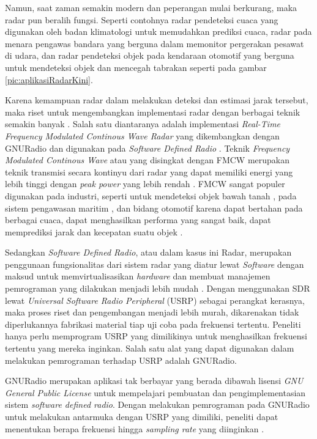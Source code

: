 Namun, saat zaman semakin modern dan peperangan mulai berkurang, maka radar pun beralih fungsi. Seperti contohnya radar pendeteksi cuaca yang digunakan oleh badan klimatologi untuk memudahkan prediksi cuaca, radar pada menara pengawas bandara yang berguna dalam memonitor pergerakan pesawat di udara, dan radar pendeteksi objek pada kendaraan otomotif yang berguna untuk mendeteksi objek dan mencegah tabrakan seperti pada gambar \ref{pic:aplikasiRadarKini}.

Karena kemampuan radar dalam melakukan deteksi dan estimasi jarak tersebut, maka riset untuk mengembangkan implementasi radar dengan berbagai teknik semakin banyak \cite{Jia2020,Xia2021,MoraHuaman2020,Sundaresan2015}. Salah satu diantaranya adalah implementasi \textit{Real-Time Frequency Modulated Continous Wave Radar} yang dikembangkan dengan GNURadio dan digunakan pada \textit{Software Defined Radio} \cite{Sundaresan2015}. Teknik \textit{Frequency Modulated Continous Wave} atau yang disingkat dengan FMCW merupakan teknik transmisi secara kontinyu dari radar yang dapat memiliki energi yang lebih tinggi dengan \textit{peak power} yang lebih rendah \cite{Stasiak2017}. FMCW sangat populer digunakan pada industri, seperti untuk mendeteksi objek bawah tanah \cite{Macasero2018}, pada sistem pengawasan maritim \cite{Lestari2017}, dan bidang otomotif  karena dapat bertahan pada berbagai cuaca, dapat menghasilkan performa yang sangat baik, dapat memprediksi jarak dan kecepatan suatu objek \cite{Deng2017}. 

Sedangkan \textit{Software Defined Radio}, atau dalam kasus ini Radar, merupakan penggunaan fungsionalitas dari sistem radar yang diatur lewat \textit{Software} dengan maksud untuk memvirtualisasikan \textit{hardware} dan membuat manajemen pemrograman yang dilakukan menjadi lebih mudah \cite{Zeng2019}. Dengan menggunakan SDR lewat \textit{Universal Software Radio Peripheral} (USRP) sebagai perangkat kerasnya, maka proses riset dan pengembangan menjadi lebih murah, dikarenakan tidak diperlukannya fabrikasi material tiap uji coba pada frekuensi tertentu. Peneliti hanya perlu memprogram USRP yang dimilikinya untuk menghasilkan frekuensi tertentu yang mereka inginkan. Salah satu alat yang dapat digunakan dalam melakukan pemrograman terhadap USRP adalah GNURadio.


GNURadio merupakan aplikasi tak berbayar yang berada dibawah lisensi \textit{GNU General Public License} untuk mempelajari pembuatan dan pengimplementasian sistem \textit{software defined radio}. Dengan melakukan pemrograman pada GNURadio untuk melakukan antarmuka dengan USRP yang dimiliki, peneliti dapat menentukan berapa frekuensi hingga \textit{sampling rate} yang diinginkan \cite{Prabaswara2011}.

